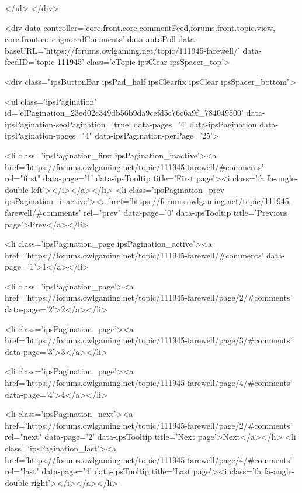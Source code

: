 	</ul>
</div>

<div data-controller='core.front.core.commentFeed,forums.front.topic.view, core.front.core.ignoredComments' data-autoPoll data-baseURL='https://forums.owlgaming.net/topic/111945-farewell/'  data-feedID='topic-111945' class='cTopic ipsClear ipsSpacer_top'>
	
		

				<div class="ipsButtonBar ipsPad_half ipsClearfix ipsClear ipsSpacer_bottom">
					
					
						


	
	<ul class='ipsPagination' id='elPagination_23ed02c349db56b9da9cefd5c76c6a9f_784049500' data-ipsPagination-seoPagination='true' data-pages='4' data-ipsPagination  data-ipsPagination-pages="4" data-ipsPagination-perPage='25'>
		
			
				<li class='ipsPagination_first ipsPagination_inactive'><a href='https://forums.owlgaming.net/topic/111945-farewell/#comments' rel="first" data-page='1' data-ipsTooltip title='First page'><i class='fa fa-angle-double-left'></i></a></li>
				<li class='ipsPagination_prev ipsPagination_inactive'><a href='https://forums.owlgaming.net/topic/111945-farewell/#comments' rel="prev" data-page='0' data-ipsTooltip title='Previous page'>Prev</a></li>
			
			<li class='ipsPagination_page ipsPagination_active'><a href='https://forums.owlgaming.net/topic/111945-farewell/#comments' data-page='1'>1</a></li>
			
				
					<li class='ipsPagination_page'><a href='https://forums.owlgaming.net/topic/111945-farewell/page/2/#comments' data-page='2'>2</a></li>
				
					<li class='ipsPagination_page'><a href='https://forums.owlgaming.net/topic/111945-farewell/page/3/#comments' data-page='3'>3</a></li>
				
					<li class='ipsPagination_page'><a href='https://forums.owlgaming.net/topic/111945-farewell/page/4/#comments' data-page='4'>4</a></li>
				
				<li class='ipsPagination_next'><a href='https://forums.owlgaming.net/topic/111945-farewell/page/2/#comments' rel="next" data-page='2' data-ipsTooltip title='Next page'>Next</a></li>
				<li class='ipsPagination_last'><a href='https://forums.owlgaming.net/topic/111945-farewell/page/4/#comments' rel="last" data-page='4' data-ipsTooltip title='Last page'><i class='fa fa-angle-double-right'></i></a></li>
			
